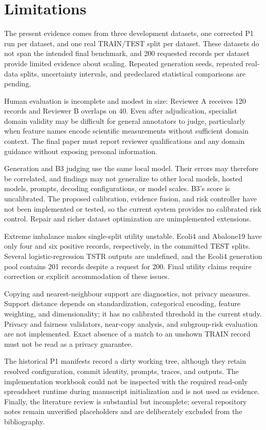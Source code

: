 \section{Limitations}
\label{sec:limitations}

The present evidence comes from three development datasets, one corrected P1
run per dataset, and one real TRAIN/TEST split per dataset. These datasets do
not span the intended final benchmark, and 200 requested records per dataset
provide limited evidence about scaling. Repeated generation seeds, repeated
real-data splits, uncertainty intervals, and predeclared statistical
comparisons are pending.

Human evaluation is incomplete and modest in size: Reviewer A receives 120
records and Reviewer B overlaps on 40. Even after adjudication, specialist
domain validity may be difficult for general annotators to judge, particularly
when feature names encode scientific measurements without sufficient domain
context. The final paper must report reviewer qualifications and any domain
guidance without exposing personal information.

Generation and B3 judging use the same local model. Their errors may therefore
be correlated, and findings may not generalize to other local models, hosted
models, prompts, decoding configurations, or model scales. B3's score is
uncalibrated. The proposed calibration, evidence fusion, and risk controller
have not been implemented or tested, so the current system provides no
calibrated risk control. Repair and richer dataset optimization are
unimplemented extensions.

Extreme imbalance makes single-split utility unstable. Ecoli4 and Abalone19
have only four and six positive records, respectively, in the committed TEST
splits. Several logistic-regression TSTR outputs are undefined, and the Ecoli4
generation pool contains 201 records despite a request for 200. Final utility
claims require correction or explicit accommodation of these issues.

Copying and nearest-neighbour support are diagnostics, not privacy measures.
Support distance depends on standardization, categorical encoding, feature
weighting, and dimensionality; it has no calibrated threshold in the current
study. Privacy and fairness validators, near-copy analysis, and subgroup-risk
evaluation are not implemented. Exact absence of a match to an unshown TRAIN
record must not be read as a privacy guarantee.

The historical P1 manifests record a dirty working tree, although they retain
resolved configuration, commit identity, prompts, traces, and outputs. The
implementation workbook could not be inspected with the required read-only
spreadsheet runtime during manuscript initialization and is not used as
evidence. Finally, the literature review is substantial but incomplete;
several repository notes remain unverified placeholders and are deliberately
excluded from the bibliography.
